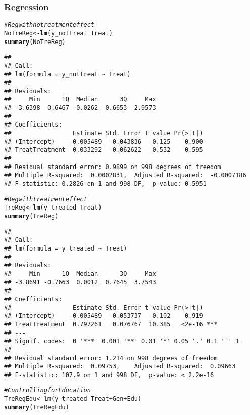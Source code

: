 \documentclass[11pt, a4paper]{article}\usepackage[]{graphicx}\usepackage[]{color}
\makeatletter
\newcommand{\hlcom}[1]{\textcolor[rgb]{0.678,0.584,0.686}{\textit{#1}}}%
\newcommand{\hlopt}[1]{\textcolor[rgb]{0,0,0}{#1}}%
\newcommand{\hlstd}[1]{\textcolor[rgb]{0.345,0.345,0.345}{#1}}%
\newcommand{\hlkwb}[1]{\textcolor[rgb]{0.69,0.353,0.396}{#1}}%
\newcommand{\hlkwd}[1]{\textcolor[rgb]{0.737,0.353,0.396}{\textbf{#1}}}%
\newenvironment{kframe}{%
 \def\at@end@of@kframe{}%
 \ifinner\ifhmode%
  \def\at@end@of@kframe{\end{minipage}}%
  \begin{minipage}{\columnwidth}%
 \fi\fi%
 \def\FrameCommand##1{\hskip\@totalleftmargin \hskip-\fboxsep
 \colorbox{shadecolor}{##1}\hskip-\fboxsep
     \hskip-\linewidth \hskip-\@totalleftmargin \hskip\columnwidth}%
 \MakeFramed {\advance\hsize-\width
   \@totalleftmargin\z@ \linewidth\hsize
   \@setminipage}}%
 {\par\unskip\endMakeFramed%
 \at@end@of@kframe}
\newenvironment{knitrout}{}{} %
\makeatother
\begin{document}
\clearpage

    \subsubsection{Regression}

\begin{knitrout}
\color{fgcolor}\begin{kframe}
\begin{alltt}
  \hlcom{#Reg with no treatment effect}
  \hlstd{NoTreReg} \hlkwb{<-} \hlkwd{lm}\hlstd{(y_nottreat} \hlopt{~} \hlstd{Treat)}
  \hlkwd{summary}\hlstd{(NoTreReg)}
\end{alltt}
\begin{verbatim}
## 
## Call:
## lm(formula = y_nottreat ~ Treat)
## 
## Residuals:
##     Min      1Q  Median      3Q     Max 
## -3.6398 -0.6467 -0.0262  0.6653  2.9573 
## 
## Coefficients:
##                 Estimate Std. Error t value Pr(>|t|)
## (Intercept)    -0.005489   0.043836  -0.125    0.900
## TreatTreatment  0.033292   0.062622   0.532    0.595
## 
## Residual standard error: 0.9899 on 998 degrees of freedom
## Multiple R-squared:  0.0002831,	Adjusted R-squared:  -0.0007186 
## F-statistic: 0.2826 on 1 and 998 DF,  p-value: 0.5951
\end{verbatim}
\begin{alltt}
  \hlcom{#Reg with treatment effect}
  \hlstd{TreReg} \hlkwb{<-} \hlkwd{lm}\hlstd{(y_treated} \hlopt{~} \hlstd{Treat)}
  \hlkwd{summary}\hlstd{(TreReg)}
\end{alltt}
\begin{verbatim}
## 
## Call:
## lm(formula = y_treated ~ Treat)
## 
## Residuals:
##     Min      1Q  Median      3Q     Max 
## -3.8691 -0.7663  0.0012  0.7645  3.7543 
## 
## Coefficients:
##                 Estimate Std. Error t value Pr(>|t|)    
## (Intercept)    -0.005489   0.053737  -0.102    0.919    
## TreatTreatment  0.797261   0.076767  10.385   <2e-16 ***
## ---
## Signif. codes:  0 '***' 0.001 '**' 0.01 '*' 0.05 '.' 0.1 ' ' 1
## 
## Residual standard error: 1.214 on 998 degrees of freedom
## Multiple R-squared:  0.09753,	Adjusted R-squared:  0.09663 
## F-statistic: 107.9 on 1 and 998 DF,  p-value: < 2.2e-16
\end{verbatim}
\begin{alltt}
  \hlcom{#Controlling for Education}
  \hlstd{TreRegEdu} \hlkwb{<-} \hlkwd{lm}\hlstd{(y_treated} \hlopt{~} \hlstd{Treat} \hlopt{+} \hlstd{Gen} \hlopt{+} \hlstd{Edu)}
  \hlkwd{summary}\hlstd{(TreRegEdu)}

\end{alltt}
\end{kframe}
\end{knitrout}
\end{document}
